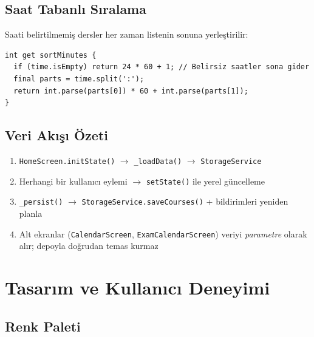 \documentclass[12pt,a4paper]{article}
\begin{document}
\subsection{Saat Tabanlı Sıralama}

Saati belirtilmemiş dersler her zaman listenin sonuna yerleştirilir:

\begin{lstlisting}[caption={Saate göre sıralama (course\_model.dart)}, label={lst:sort}]
int get sortMinutes {
  if (time.isEmpty) return 24 * 60 + 1; // Belirsiz saatler sona gider
  final parts = time.split(':');
  return int.parse(parts[0]) * 60 + int.parse(parts[1]);
}
\end{lstlisting}

\subsection{Veri Akışı Özeti}

\begin{enumerate}
    \item \texttt{HomeScreen.initState()} $\rightarrow$ \texttt{\_loadData()} $\rightarrow$ \texttt{StorageService}
    \item Herhangi bir kullanıcı eylemi $\rightarrow$ \texttt{setState()} ile yerel güncelleme
    \item \texttt{\_persist()} $\rightarrow$ \texttt{StorageService.saveCourses()} + bildirimleri yeniden planla
    \item Alt ekranlar (\texttt{CalendarScreen}, \texttt{ExamCalendarScreen}) veriyi \textit{parametre} olarak alır; depoyla doğrudan temas kurmaz
\end{enumerate}

\section{Tasarım ve Kullanıcı Deneyimi}

\subsection{Renk Paleti}
\end{document}
